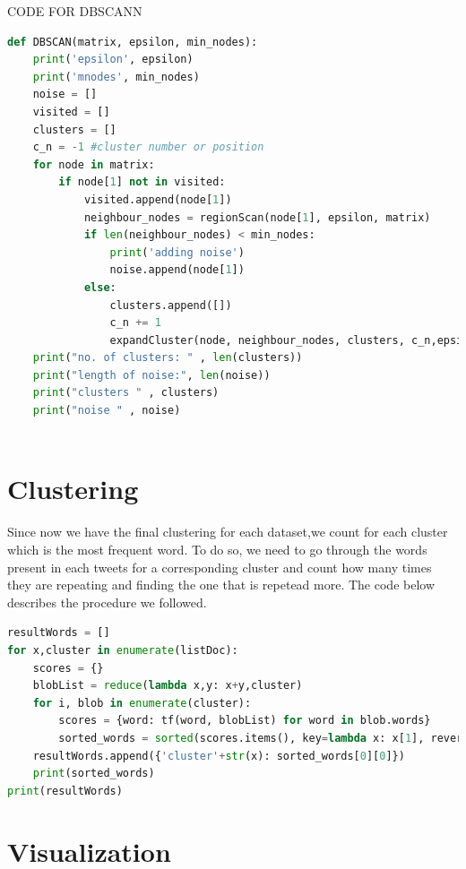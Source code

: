 \documentclass{article}
\begin{document}
CODE FOR DBSCANN
\begin{lstlisting}[language=Python, caption= DBSCAN Algorithm, label={lst:DBSCAN implementation}]
def DBSCAN(matrix, epsilon, min_nodes):
    print('epsilon', epsilon)
    print('mnodes', min_nodes)
    noise = []
    visited = []
    clusters = []
    c_n = -1 #cluster number or position
    for node in matrix:
        if node[1] not in visited:
            visited.append(node[1])
            neighbour_nodes = regionScan(node[1], epsilon, matrix)
            if len(neighbour_nodes) < min_nodes:
                print('adding noise')
                noise.append(node[1])
            else:
                clusters.append([])
                c_n += 1
                expandCluster(node, neighbour_nodes, clusters, c_n,epsilon, min_nodes, matrix, visited)
    print("no. of clusters: " , len(clusters))
    print("length of noise:", len(noise))
    print("clusters " , clusters)
    print("noise " , noise)
            
            \end{lstlisting}

        \section{Clustering}
        
Since now we have the final clustering for each dataset,we count for each cluster which is the most frequent word. To do so, we need to go through the words present in each tweets for a corresponding cluster and count how many times they are repeating and finding the one that is repetead more. The code below describes the procedure we followed. 

\begin{lstlisting}[language=Python, caption= Mostly used word/cluster, label={lst:Mostly used word/cluster}]
resultWords = []
for x,cluster in enumerate(listDoc):
    scores = {}
    blobList = reduce(lambda x,y: x+y,cluster)
    for i, blob in enumerate(cluster):
        scores = {word: tf(word, blobList) for word in blob.words}
        sorted_words = sorted(scores.items(), key=lambda x: x[1], reverse=True)
    resultWords.append({'cluster'+str(x): sorted_words[0][0]})
    print(sorted_words)
print(resultWords)
 \end{lstlisting}

        \section{Visualization}
        
\end{document}
